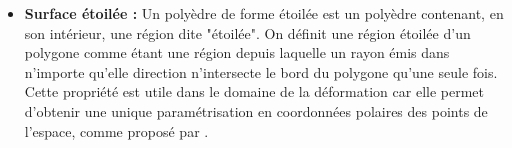 \begin{itemize}
\item{\textbf{Surface étoilée :}} Un polyèdre de forme étoilée est un
  polyèdre contenant, en son intérieur, une région dite "étoilée". On
  définit une région étoilée d'un polygone comme étant une région
  depuis laquelle un rayon émis dans n'importe qu'elle direction
  n'intersecte le bord du polygone qu'une seule fois. Cette propriété
  est utile dans le domaine de la déformation car elle permet
  d'obtenir une unique paramétrisation en coordonnées polaires des
  points de l'espace, comme proposé par \cite{JL00}.

\end{itemize}
